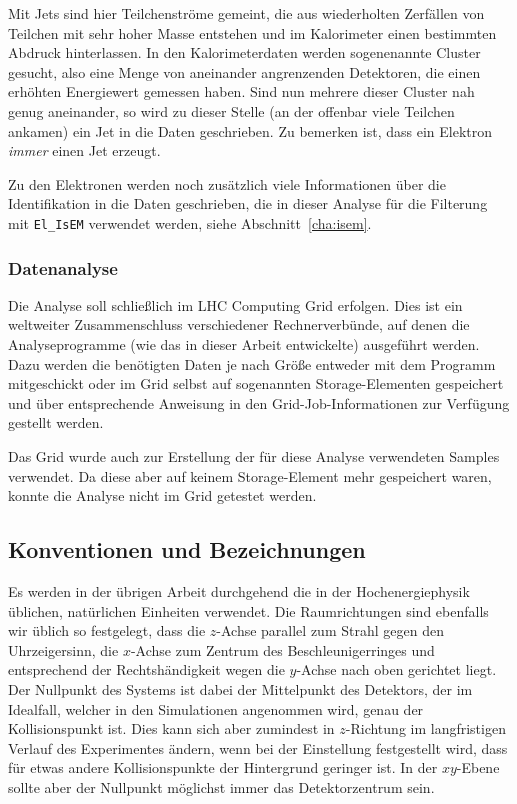 \label{jet-recon}
Mit Jets sind hier Teilchenströme gemeint, die aus wiederholten Zerfällen von
Teilchen mit sehr hoher Masse entstehen und im Kalorimeter einen bestimmten
Abdruck hinterlassen. In den Kalorimeterdaten werden sogenenannte Cluster
gesucht, also eine Menge von aneinander angrenzenden Detektoren, die einen
erhöhten Energiewert gemessen haben. Sind nun mehrere dieser Cluster nah genug
aneinander, so wird zu dieser Stelle (an der offenbar viele Teilchen ankamen)
ein Jet in die Daten geschrieben. Zu bemerken ist, dass ein Elektron
\emph{immer} einen Jet erzeugt.

Zu den Elektronen werden noch zusätzlich viele Informationen über die
Identifikation in die Daten geschrieben, die in dieser Analyse für die Filterung
mit \lstinline'El_IsEM' verwendet werden, siehe Abschnitt~\ref{cha:isem}.

\subsubsection{Datenanalyse}
Die Analyse soll schließlich im LHC Computing Grid erfolgen. Dies ist ein
weltweiter Zusammenschluss verschiedener Rechnerverbünde, auf denen die
Analyseprogramme (wie das in dieser Arbeit entwickelte) ausgeführt werden. Dazu
werden die benötigten Daten je nach Größe entweder mit dem Programm mitgeschickt
oder im Grid selbst auf sogenannten Storage-Elementen gespeichert und über
entsprechende Anweisung in den Grid-Job-Informationen zur Verfügung gestellt
werden.

Das Grid wurde auch zur Erstellung der für diese Analyse verwendeten Samples
verwendet. Da diese aber auf keinem Storage-Element mehr gespeichert waren,
konnte die Analyse nicht im Grid getestet werden.

\subsection{Konventionen und Bezeichnungen}
\label{cha:conv}
Es werden in der übrigen Arbeit durchgehend die in der Hochenergiephysik
üblichen, natürlichen Einheiten verwendet. Die Raumrichtungen sind ebenfalls wir
üblich so festgelegt, dass die $z$-Achse parallel zum Strahl gegen den
Uhrzeigersinn, die $x$-Achse zum Zentrum des Beschleunigerringes und
entsprechend der Rechtshändigkeit wegen die $y$-Achse nach oben gerichtet liegt.
Der Nullpunkt des Systems ist dabei der Mittelpunkt des Detektors, der im
Idealfall, welcher in den Simulationen angenommen wird, genau der
Kollisionspunkt ist.  Dies kann sich aber zumindest in $z$-Richtung im
langfristigen Verlauf des Experimentes ändern, wenn bei der Einstellung
festgestellt wird, dass für etwas andere Kollisionspunkte der Hintergrund
geringer ist. In der $xy$-Ebene sollte aber der Nullpunkt möglichst immer das
Detektorzentrum sein.

